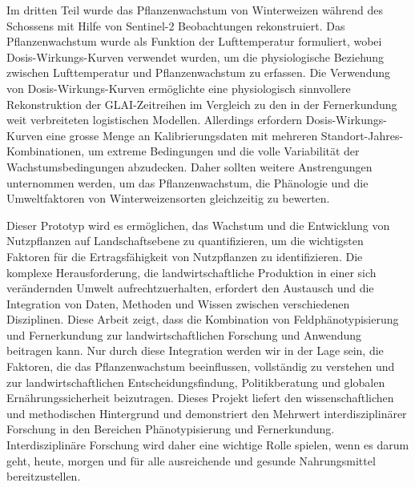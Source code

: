 Im dritten Teil wurde das Pflanzenwachstum von Winterweizen während des Schossens mit Hilfe von Sentinel-2 Beobachtungen rekonstruiert. Das Pflanzenwachstum wurde als Funktion der Lufttemperatur formuliert, wobei Dosis-Wirkungs-Kurven verwendet wurden, um die physiologische Beziehung zwischen Lufttemperatur und Pflanzenwachstum zu erfassen. Die Verwendung von Dosis-Wirkungs-Kurven ermöglichte eine physiologisch sinnvollere Rekonstruktion der GLAI-Zeitreihen im Vergleich zu den in der Fernerkundung weit verbreiteten logistischen Modellen. Allerdings erfordern Dosis-Wirkungs-Kurven eine grosse Menge an Kalibrierungsdaten mit mehreren Standort-Jahres-Kombinationen, um extreme Bedingungen und die volle Variabilität der Wachstumsbedingungen abzudecken. Daher sollten weitere Anstrengungen unternommen werden, um das Pflanzenwachstum, die Phänologie und die Umweltfaktoren von Winterweizensorten gleichzeitig zu bewerten.

Dieser Prototyp wird es ermöglichen, das Wachstum und die Entwicklung von Nutzpflanzen auf Landschaftsebene zu quantifizieren, um die wichtigsten Faktoren für die Ertragsfähigkeit von Nutzpflanzen zu identifizieren. Die komplexe Herausforderung, die landwirtschaftliche Produktion in einer sich verändernden Umwelt aufrechtzuerhalten, erfordert den Austausch und die Integration von Daten, Methoden und Wissen zwischen verschiedenen Disziplinen. Diese Arbeit zeigt, dass die Kombination von Feldphänotypisierung und Fernerkundung zur landwirtschaftlichen Forschung und Anwendung beitragen kann. Nur durch diese Integration werden wir in der Lage sein, die Faktoren, die das Pflanzenwachstum beeinflussen, vollständig zu verstehen und zur landwirtschaftlichen Entscheidungsfindung, Politikberatung und globalen Ernährungssicherheit beizutragen. Dieses Projekt liefert den wissenschaftlichen und methodischen Hintergrund und demonstriert den Mehrwert interdisziplinärer Forschung in den Bereichen Phänotypisierung und Fernerkundung. Interdisziplinäre Forschung wird daher eine wichtige Rolle spielen, wenn es darum geht, heute, morgen und für alle ausreichende und gesunde Nahrungsmittel bereitzustellen.
